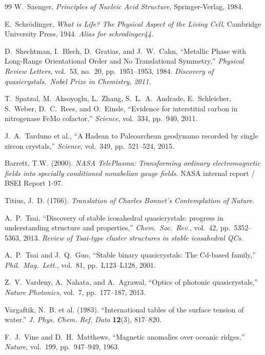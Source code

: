 \documentclass[12pt,oneside]{book}
\begin{document}
\begin{thebibliography}{99}
W.~Saenger,
\emph{Principles of Nucleic Acid Structure},
Springer-Verlag, 1984.

E.~Schr\"odinger,
\emph{What is Life? The Physical Aspect of the Living Cell},
Cambridge University Press, 1944.
\textit{Alias for schrodinger44.}

D.~Shechtman, I.~Blech, D.~Gratias, and J.~W.~Cahn,
``Metallic Phase with Long-Range Orientational Order and No Translational Symmetry,''
\emph{Physical Review Letters}, vol.~53, no.~20, pp.~1951--1953, 1984.
\textit{Discovery of quasicrystals.\ Nobel Prize in Chemistry, 2011.}

T.~Spatzal, M.~Aksoyoglu, L.~Zhang, S.~L.~A.~Andrade, E.~Schleicher, S.~Weber,
D.~C.~Rees, and O.~Einsle,
``Evidence for interstitial carbon in nitrogenase FeMo cofactor,''
\emph{Science}, vol.~334, pp.~940, 2011.

J.~A.~Tarduno et al.,
``A Hadean to Paleoarchean geodynamo recorded by single zircon crystals,''
\emph{Science}, vol.~349, pp.~521--524, 2015.

Barrett, T.W. (2000).
\textit{NASA TelePlasma: Transforming ordinary electromagnetic fields into specially conditioned nonabelian gauge fields}.
NASA internal report / BSEI Report 1-97.

Titius, J.~D. (1766).
\textit{Translation of Charles Bonnet's Contemplation of Nature}.

A.~P.~Tsai,
``Discovery of stable icosahedral quasicrystals: progress in understanding structure and properties,''
\emph{Chem.\ Soc.\ Rev.}, vol.~42, pp.~5352--5363, 2013.
\textit{Review of Tsai-type cluster structures in stable icosahedral QCs.}

A.~P.~Tsai and J.~Q.~Guo,
``Stable binary quasicrystals: The Cd-based family,''
\emph{Phil.\ Mag.\ Lett.}, vol.~81, pp.~L123--L128, 2001.

Z.~V.~Vardeny, A.~Nahata, and A.~Agrawal,
``Optics of photonic quasicrystals,''
\emph{Nature Photonics}, vol.~7, pp.~177--187, 2013.

Vargaftik, N.~B. et al. (1983).
``International tables of the surface tension of water.''
\textit{J. Phys. Chem. Ref. Data} \textbf{12}(3), 817--820.

F.~J.~Vine and D.~H.~Matthews,
``Magnetic anomalies over oceanic ridges,''
\emph{Nature}, vol.~199, pp.~947--949, 1963.


\end{thebibliography}
\end{document}
